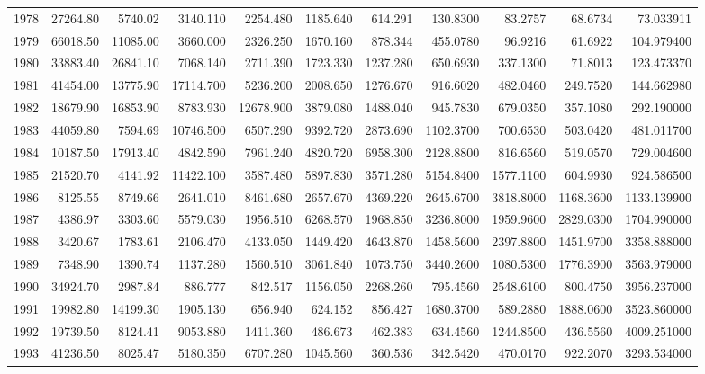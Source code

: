 \documentclass[]{article}
\begin{document}
\begin{table}[ht]
\begin{tabular}{rrrrrrrrrrr}
  1978 & 27264.80 & 5740.02 & 3140.110 & 2254.480 & 1185.640 & 614.291 & 130.8300 & 83.2757 & 68.6734 & 73.033911 \\ 
  1979 & 66018.50 & 11085.00 & 3660.000 & 2326.250 & 1670.160 & 878.344 & 455.0780 & 96.9216 & 61.6922 & 104.979400 \\ 
  1980 & 33883.40 & 26841.10 & 7068.140 & 2711.390 & 1723.330 & 1237.280 & 650.6930 & 337.1300 & 71.8013 & 123.473370 \\ 
  1981 & 41454.00 & 13775.90 & 17114.700 & 5236.200 & 2008.650 & 1276.670 & 916.6020 & 482.0460 & 249.7520 & 144.662980 \\ 
  1982 & 18679.90 & 16853.90 & 8783.930 & 12678.900 & 3879.080 & 1488.040 & 945.7830 & 679.0350 & 357.1080 & 292.190000 \\ 
  1983 & 44059.80 & 7594.69 & 10746.500 & 6507.290 & 9392.720 & 2873.690 & 1102.3700 & 700.6530 & 503.0420 & 481.011700 \\ 
  1984 & 10187.50 & 17913.40 & 4842.590 & 7961.240 & 4820.720 & 6958.300 & 2128.8800 & 816.6560 & 519.0570 & 729.004600 \\ 
  1985 & 21520.70 & 4141.92 & 11422.100 & 3587.480 & 5897.830 & 3571.280 & 5154.8400 & 1577.1100 & 604.9930 & 924.586500 \\ 
  1986 & 8125.55 & 8749.66 & 2641.010 & 8461.680 & 2657.670 & 4369.220 & 2645.6700 & 3818.8000 & 1168.3600 & 1133.139900 \\ 
  1987 & 4386.97 & 3303.60 & 5579.030 & 1956.510 & 6268.570 & 1968.850 & 3236.8000 & 1959.9600 & 2829.0300 & 1704.990000 \\ 
  1988 & 3420.67 & 1783.61 & 2106.470 & 4133.050 & 1449.420 & 4643.870 & 1458.5600 & 2397.8800 & 1451.9700 & 3358.888000 \\ 
  1989 & 7348.90 & 1390.74 & 1137.280 & 1560.510 & 3061.840 & 1073.750 & 3440.2600 & 1080.5300 & 1776.3900 & 3563.979000 \\ 
  1990 & 34924.70 & 2987.84 & 886.777 & 842.517 & 1156.050 & 2268.260 & 795.4560 & 2548.6100 & 800.4750 & 3956.237000 \\ 
  1991 & 19982.80 & 14199.30 & 1905.130 & 656.940 & 624.152 & 856.427 & 1680.3700 & 589.2880 & 1888.0600 & 3523.860000 \\ 
  1992 & 19739.50 & 8124.41 & 9053.880 & 1411.360 & 486.673 & 462.383 & 634.4560 & 1244.8500 & 436.5560 & 4009.251000 \\ 
  1993 & 41236.50 & 8025.47 & 5180.350 & 6707.280 & 1045.560 & 360.536 & 342.5420 & 470.0170 & 922.2070 & 3293.534000 \\ 

\end{tabular}
\end{table}
\end{document}
